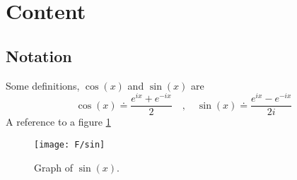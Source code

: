 \section{Content}

\subsection{Notation}

\begin{Defn}
  \label{defn:1}
  Some definitions, $\cos(x)$ and \(\sin(x)\) are
  \begin{equation}
    \label{eq:fefwe}
    \cos(x) \doteq \frac{e^{ix}+e^{-ix}}{2} \quad,\quad     \sin(x) \doteq \frac{e^{ix}-e^{-ix}}{2i}
  \end{equation}
  A reference to a figure \ref{fig:a354}
\end{Defn}



\begin{figure}[ht]\label{fig:a354}
  \begin{center}
    \texttt{[image: F/sin]}
    \caption{Graph of \(\sin(x)\).}
  \end{center}
\end{figure}


\lipsum[2]
